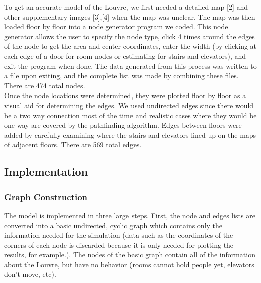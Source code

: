 \documentclass[12pt]{article}
\begin{document}
To get an accurate model of the Louvre, we first needed a detailed map [2] and other supplementary images [3],[4] when the map was unclear. The map was then loaded floor by floor into a node generator program we coded. This node generator allows the user to specify the node type, click 4 times around the edges of the node to get the area and center coordinates, enter the width (by clicking at each edge of a door for room nodes or estimating for stairs and elevators), and exit the program when done. The data generated from this process was written to a file upon exiting, and the complete list was made by combining these files. There are 474 total nodes.\\
Once the node locations were determined, they were plotted floor by floor as a visual aid for determining the edges. We used undirected edges since there would be a two way connection most of the time and realistic cases where they would be one way are covered by the pathfinding algorithm. Edges between floors were added by carefully examining where the stairs and elevators lined up on the maps of adjacent floors. There are 569 total edges.

\subsection{Implementation}

\subsubsection{Graph Construction}
The model is implemented in three large steps. First, the node and edges lists are converted into a basic undirected, cyclic graph which contains only the information needed for the simulation (data such as the coordinates of the corners of each node is discarded because it is only needed for plotting the results, for example.). The nodes of the basic graph contain all of the information about the Louvre, but have no behavior (rooms cannot hold people yet, elevators don't move, etc).\\
\end{document}
